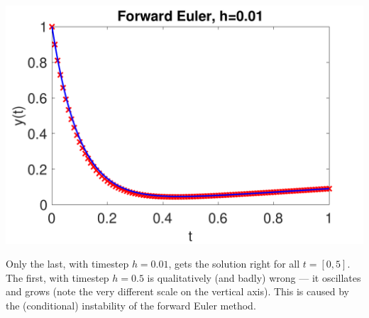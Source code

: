 \documentclass[a4paper,11pt]{article}
\begin{document}
\begin{enumerate}
\begin{center}
      \includegraphics[scale=0.3]{images/Q1a_3.pdf}
    \end{center}
    Only the last, with timestep $h=0.01$, gets the solution right for all $t=[0,5]$.
    The first, with timestep $h=0.5$ is qualitatively (and badly) wrong --- it oscillates and grows (note the very different scale on the
    vertical axis). This is caused by the (conditional) instability of the forward Euler
    method.
    

\end{enumerate}
\end{document}
